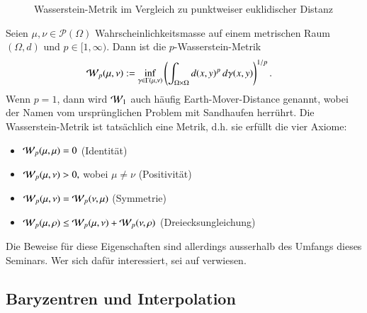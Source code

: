 \begin{figure}
\centering

\caption{Wasserstein-Metrik im Vergleich zu punktweiser euklidischer Distanz}
\label{mongekant:fig:wasserstein}
\end{figure}

Seien $\mu, \nu \in \mathcal{P}(\Omega)$ Wahrscheinlichkeitsmasse
auf einem metrischen Raum $(\Omega, d)$ und $p \in [1, \infty)$.
Dann ist die $p$-Wasserstein-Metrik
\begin{align}
\wasserstein(\mu, \nu)
&:=
\inf_{\gamma \in \Gamma(\mu, \nu)}
\left(
\int_{\Omega \times \Omega} d(x,y)^p\, d\gamma(x,y)
\right)^{1/p}
.
\label{mongekant:eq:wasserstein_metric}
\end{align}
Wenn $p=1$,
dann wird $\wasserstein[1]$ auch häufig Earth-Mover-Distance genannt,
wobei der Namen vom ursprünglichen Problem mit Sandhaufen herrührt.
Die Wasserstein-Metrik ist tatsächlich eine Metrik,
d.h. sie erfüllt die vier Axiome:
\begin{itemize}
\item $\wasserstein(\mu, \mu) = 0$ (Identität)
\item $\wasserstein(\mu, \nu) > 0,$ wobei $\mu \neq \nu$ (Positivität)
\item $\wasserstein(\mu, \nu) = \wasserstein(\nu, \mu)$ (Symmetrie)
\item $\wasserstein(\mu, \rho) \leq \wasserstein(\mu, \nu) + \wasserstein(\nu, \rho)$
(Dreiecksungleichung)
\end{itemize}
Die Beweise für diese Eigenschaften sind allerdings
ausserhalb des Umfangs dieses Seminars.
Wer sich dafür interessiert,
sei auf \cite{mongekant:villani} verwiesen.

\subsection{Baryzentren und Interpolation
\label{mongekant:subsection:interpolation}}

